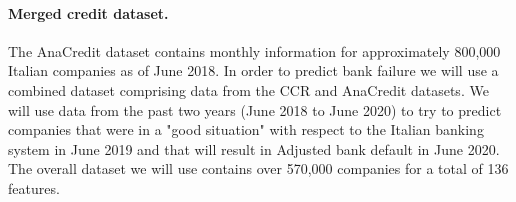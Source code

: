 \paragraph{Merged credit dataset.}

The AnaCredit dataset contains monthly information for approximately 800,000 Italian companies as of June 2018.
In order to predict bank failure we will use a combined dataset comprising data from the CCR and AnaCredit datasets. We will use data from the past two years (June 2018 to June 2020) to try to predict companies that were in a "good situation" with respect to the Italian banking system in June 2019 and that will result in Adjusted bank default in June 2020. The overall dataset we will use contains over 570,000 companies for a total of 136 features.






\begin{comment}
    

Our second dataset consists of the balance-sheet data of about $300K$
Italian firms. They are generally medium and large companies and they
form a subset of the $800K$ companies with loan data. 
It contains balance-sheet information for each year from 2006 to 2014.
The main features include those that regard the profitability of a company, such as return
of equity (ROE) and return of assets (ROA); see Table~\ref{tbl:attributes} for a more
extended list. Typically balance sheet data are public data and have been used extensively for
bankruptcy prediction (e.g., see Barboza et
al.~\cite{altman-bankruptcy-17} and references therein).
%
%
%
%

\end{comment}

